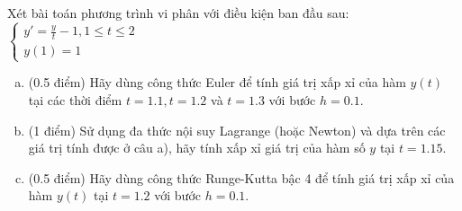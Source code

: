 \documentclass[12pt]{article}
\begin{document}
Xét bài toán phương trình vi phân với điều kiện ban đầu sau:
$
 \left\lbrace \begin{array}{l}
               y' = \frac{y}{t}-1, 1 \leq t \leq 2 \\
               y(1)=1
              \end{array}
\right.
$

\begin{enumerate}[a).]
\item (0.5 điểm) Hãy dùng công thức Euler để tính giá trị xấp xỉ của hàm $y(t)$ tại các thời điểm $t=1.1, t=1.2$ và $t=1.3$ với bước $h=0.1$.
\item (1 điểm) Sử dụng đa thức nội suy Lagrange (hoặc Newton) và dựa trên các giá trị tính được ở câu a), hãy tính xấp xỉ giá trị của hàm số $y$ tại $t=1.15$.
\item (0.5 điểm) Hãy dùng công thức Runge-Kutta bậc 4 để tính giá trị xấp xỉ của hàm $y(t)$ tại $t=1.2$ với bước $h=0.1$.
\end{enumerate}
\end{document}
